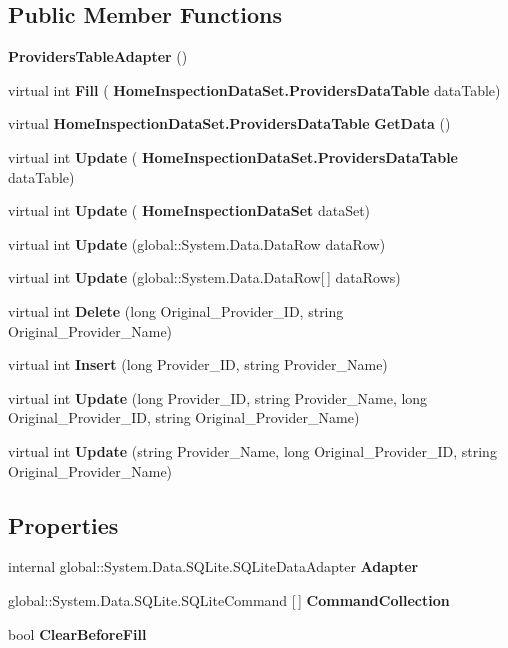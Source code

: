 \subsection*{Public Member Functions}
\begin{DoxyCompactItemize}
\item 
\textbf{ Providers\+Table\+Adapter} ()
\item 
virtual int \textbf{ Fill} (\textbf{ Home\+Inspection\+Data\+Set.\+Providers\+Data\+Table} data\+Table)
\item 
virtual \textbf{ Home\+Inspection\+Data\+Set.\+Providers\+Data\+Table} \textbf{ Get\+Data} ()
\item 
virtual int \textbf{ Update} (\textbf{ Home\+Inspection\+Data\+Set.\+Providers\+Data\+Table} data\+Table)
\item 
virtual int \textbf{ Update} (\textbf{ Home\+Inspection\+Data\+Set} data\+Set)
\item 
virtual int \textbf{ Update} (global\+::\+System.\+Data.\+Data\+Row data\+Row)
\item 
virtual int \textbf{ Update} (global\+::\+System.\+Data.\+Data\+Row[$\,$] data\+Rows)
\item 
virtual int \textbf{ Delete} (long Original\+\_\+\+Provider\+\_\+\+ID, string Original\+\_\+\+Provider\+\_\+\+Name)
\item 
virtual int \textbf{ Insert} (long Provider\+\_\+\+ID, string Provider\+\_\+\+Name)
\item 
virtual int \textbf{ Update} (long Provider\+\_\+\+ID, string Provider\+\_\+\+Name, long Original\+\_\+\+Provider\+\_\+\+ID, string Original\+\_\+\+Provider\+\_\+\+Name)
\item 
virtual int \textbf{ Update} (string Provider\+\_\+\+Name, long Original\+\_\+\+Provider\+\_\+\+ID, string Original\+\_\+\+Provider\+\_\+\+Name)
\end{DoxyCompactItemize}
\subsection*{Properties}
\begin{DoxyCompactItemize}
\item 
internal global\+::\+System.\+Data.\+S\+Q\+Lite.\+S\+Q\+Lite\+Data\+Adapter \textbf{ Adapter}\hspace{0.3cm}{\ttfamily  [get]}
\item 
global\+::\+System.\+Data.\+S\+Q\+Lite.\+S\+Q\+Lite\+Command [$\,$] \textbf{ Command\+Collection}\hspace{0.3cm}{\ttfamily  [get]}
\item 
bool \textbf{ Clear\+Before\+Fill}\hspace{0.3cm}{\ttfamily  [get, set]}
\end{DoxyCompactItemize}


